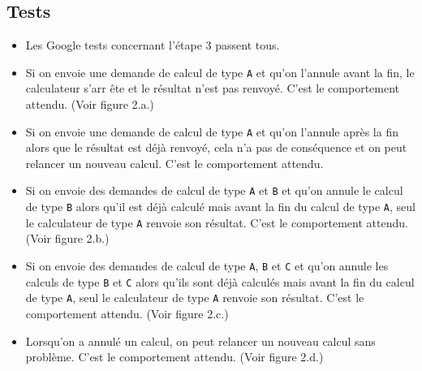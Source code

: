 \documentclass{article}
\begin{document}
\subsection{Tests}
\begin{itemize}
    \item Les Google tests concernant l'étape 3 passent tous.
    \item Si on envoie une demande de calcul de type \texttt{A} et qu'on l'annule avant la fin, le calculateur s'arr
    ête et le résultat n'est pas renvoyé. C'est le comportement attendu. (Voir figure 2.a.)
    \item Si on envoie une demande de calcul de type \texttt{A} et qu'on l'annule après la fin alors que le résultat
    est déjà renvoyé, cela n'a pas de conséquence et on peut relancer un nouveau calcul. C'est le comportement attendu.
    \item Si on envoie des demandes de calcul de type \texttt{A} et \texttt{B} et qu'on annule le calcul de type \texttt{B}
    alors qu'il est déjà calculé mais avant la fin du calcul de type \texttt{A}, seul le calculateur de type \texttt{A}
    renvoie son résultat. C'est le comportement attendu. (Voir figure 2.b.)
    \item Si on envoie des demandes de calcul de type \texttt{A}, \texttt{B} et \texttt{C} et qu'on annule les
    calculs de type \texttt{B} et \texttt{C} alors qu'ils sont déjà calculés mais avant la fin du calcul de type \texttt{A},
    seul le calculateur de type \texttt{A} renvoie son résultat. C'est le comportement attendu. (Voir figure 2.c.)
    \item Lorsqu'on a annulé un calcul, on peut relancer un nouveau calcul sans problème. C'est le comportement
    attendu. (Voir figure 2.d.)
\end{itemize}
\end{document}
